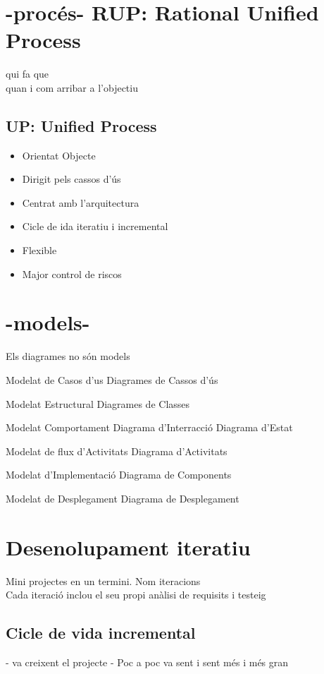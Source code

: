 \documentclass{article}
\begin{document}
\section{-procés- RUP: Rational Unified Process}
qui fa que\\
quan i com arribar a l'objectiu\\

\subsection{UP: Unified Process}
\begin{itemize}
\item Orientat Objecte
\item Dirigit pels cassos d'ús
\item Centrat amb l'arquitectura
\item Cicle de ida iteratiu i incremental
\item Flexible
\item Major control de riscos
\end{itemize}

\section{-models-}
Els diagrames no són models
\begin{itemize}
\item Modelat de Casos d'us
	\subitem Diagrames de Cassos d'ús
\item Modelat Estructural
	\subitem Diagrames de Classes
\item Modelat Comportament
	\subitem Diagrama d'Interracció
	\subitem Diagrama d'Estat
{\color{blue}
\item Modelat de flux d'Activitats
	\subitem Diagrama d'Activitats
\item Modelat d'Implementació
	\subitem Diagrama de Components
\item Modelat de Desplegament
	\subitem Diagrama de Desplegament
}
\end{itemize}

\section{Desenolupament iteratiu}
Mini projectes en un termini. Nom iteracions\\
Cada iteració inclou el seu propi anàlisi de requisits i testeig
\subsection{Cicle de vida incremental}
- va creixent el projecte - Poc a poc va sent i sent més i més gran
\end{document}

